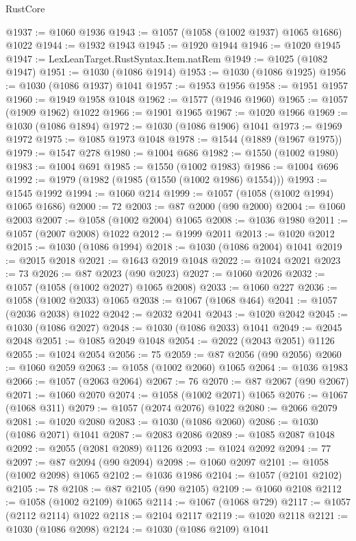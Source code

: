 \begin{lexlean}{RustCore}
\begin{coremodule}
@1937 := @1060 @1936
@1943 := @1057 (@1058 (@1002 @1937) @1065 @1686) @1022
@1944 := @1932 @1943
@1945 := @1920 @1944
@1946 := @1020 @1945
@1947 := LexLeanTarget.RustSyntax.Item.natRem
@1949 := @1025 (@1082 @1947)
@1951 := @1030 (@1086 @1914)
@1953 := @1030 (@1086 @1925)
@1956 := @1030 (@1086 @1937) @1041
@1957 := @1953 @1956
@1958 := @1951 @1957
@1960 := @1949 @1958 @1048
@1962 := @1577 (@1946 @1960)
@1965 := @1057 (@1909 @1962) @1022
@1966 := @1901 @1965
@1967 := @1020 @1966
@1969 := @1030 (@1086 @1894)
@1972 := @1030 (@1086 @1906) @1041
@1973 := @1969 @1972
@1975 := @1085 @1973 @1048
@1978 := @1544 (@1889 (@1967 @1975))
@1979 := @1547 @278
@1980 := @1004 @686
@1982 := @1550 (@1002 @1980)
@1983 := @1004 @691
@1985 := @1550 (@1002 @1983)
@1986 := @1004 @696
@1992 := @1979 (@1982 (@1985 (@1550 (@1002 @1986) @1554)))
@1993 := @1545 @1992
@1994 := @1060 @214
@1999 := @1057 (@1058 (@1002 @1994) @1065 @1686)
@2000 := 72
@2003 := @87 @2000 (@90 @2000)
@2004 := @1060 @2003
@2007 := @1058 (@1002 @2004) @1065
@2008 := @1036 @1980
@2011 := @1057 (@2007 @2008) @1022
@2012 := @1999 @2011
@2013 := @1020 @2012
@2015 := @1030 (@1086 @1994)
@2018 := @1030 (@1086 @2004) @1041
@2019 := @2015 @2018
@2021 := @1643 @2019 @1048
@2022 := @1024 @2021
@2023 := 73
@2026 := @87 @2023 (@90 @2023)
@2027 := @1060 @2026
@2032 := @1057 (@1058 (@1002 @2027) @1065 @2008)
@2033 := @1060 @227
@2036 := @1058 (@1002 @2033) @1065
@2038 := @1067 (@1068 @464)
@2041 := @1057 (@2036 @2038) @1022
@2042 := @2032 @2041
@2043 := @1020 @2042
@2045 := @1030 (@1086 @2027)
@2048 := @1030 (@1086 @2033) @1041
@2049 := @2045 @2048
@2051 := @1085 @2049 @1048
@2054 := @2022 (@2043 @2051) @1126
@2055 := @1024 @2054
@2056 := 75
@2059 := @87 @2056 (@90 @2056)
@2060 := @1060 @2059
@2063 := @1058 (@1002 @2060) @1065
@2064 := @1036 @1983
@2066 := @1057 (@2063 @2064)
@2067 := 76
@2070 := @87 @2067 (@90 @2067)
@2071 := @1060 @2070
@2074 := @1058 (@1002 @2071) @1065
@2076 := @1067 (@1068 @311)
@2079 := @1057 (@2074 @2076) @1022
@2080 := @2066 @2079
@2081 := @1020 @2080
@2083 := @1030 (@1086 @2060)
@2086 := @1030 (@1086 @2071) @1041
@2087 := @2083 @2086
@2089 := @1085 @2087 @1048
@2092 := @2055 (@2081 @2089) @1126
@2093 := @1024 @2092
@2094 := 77
@2097 := @87 @2094 (@90 @2094)
@2098 := @1060 @2097
@2101 := @1058 (@1002 @2098) @1065
@2102 := @1036 @1986
@2104 := @1057 (@2101 @2102)
@2105 := 78
@2108 := @87 @2105 (@90 @2105)
@2109 := @1060 @2108
@2112 := @1058 (@1002 @2109) @1065
@2114 := @1067 (@1068 @729)
@2117 := @1057 (@2112 @2114) @1022
@2118 := @2104 @2117
@2119 := @1020 @2118
@2121 := @1030 (@1086 @2098)
@2124 := @1030 (@1086 @2109) @1041

\end{coremodule}
\end{lexlean}

